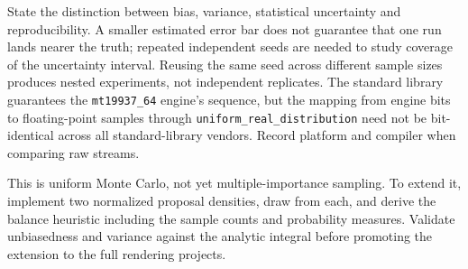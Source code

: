 \begin{booktwopitfall}
State the distinction between bias, variance, statistical uncertainty
and reproducibility. A smaller estimated error bar does not guarantee
that one run lands nearer the truth; repeated independent seeds are
needed to study coverage of the uncertainty interval. Reusing the
same seed across different sample sizes produces nested experiments,
not independent replicates. The standard library guarantees the
\texttt{mt19937\_64} engine's sequence, but the mapping from engine
bits to floating-point samples through
\texttt{uniform\_real\_distribution} need not be bit-identical across
all standard-library vendors. Record platform and compiler when
comparing raw streams.

\end{booktwopitfall}

This is uniform Monte Carlo, not yet multiple-importance sampling.
To extend it, implement two normalized proposal densities, draw
from each, and derive the balance heuristic including the sample
counts and probability measures. Validate unbiasedness and variance
against the analytic integral before promoting the extension to the
full rendering projects.
